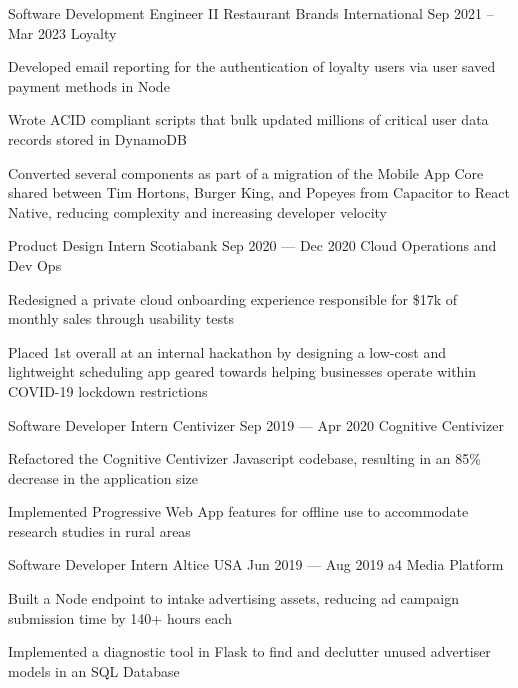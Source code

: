 \begin{cventries}
  \cventry
      {Software Development Engineer II}
      {Restaurant Brands International}
      {}
      {Sep 2021 -- Mar 2023}
      {Loyalty}
      {
        \begin{cvitems}
          \item {Developed email reporting for the authentication of loyalty users via user saved payment methods in Node}
          \item {Wrote ACID compliant scripts that bulk updated millions of critical user data records stored in DynamoDB}
          \item {Converted several components as part of a migration of the Mobile App Core shared between Tim Hortons, Burger King, and Popeyes from Capacitor to React Native, reducing complexity and increasing developer velocity}
        \end{cvitems}
      }
  \cventry
    {Product Design Intern}
    {Scotiabank}
    {}
    {Sep 2020 --- Dec 2020}
    {Cloud Operations and Dev Ops}
    {
      \begin{cvitems}
        \item {Redesigned a private cloud onboarding experience responsible for \$17k of monthly sales through usability tests}
        \item {Placed 1st overall at an internal hackathon by designing a low-cost and lightweight scheduling app geared towards helping businesses operate within COVID-19 lockdown restrictions}
      \end{cvitems}
    }
  \cventry
    {Software Developer Intern}
    {Centivizer}
    {}
    {Sep 2019 --- Apr 2020}
    {Cognitive Centivizer}
    {
      \begin{cvitems}
        \item {Refactored the Cognitive Centivizer Javascript codebase, resulting in an 85\% decrease in the application size}
        \item {Implemented Progressive Web App features for offline use to accommodate research studies in rural areas}
      \end{cvitems}
    }

  \cventry
    {Software Developer Intern}
    {Altice USA}
    {}
    {Jun 2019 --- Aug 2019}
    {a4 Media Platform}
    {
    \begin{cvitems}
      \item {Built a Node endpoint to intake advertising assets, reducing ad campaign submission time by 140+ hours each}
      \item {Implemented a diagnostic tool in Flask to find and declutter unused advertiser models in an SQL Database}
    \end{cvitems}
    }


\end{cventries}
